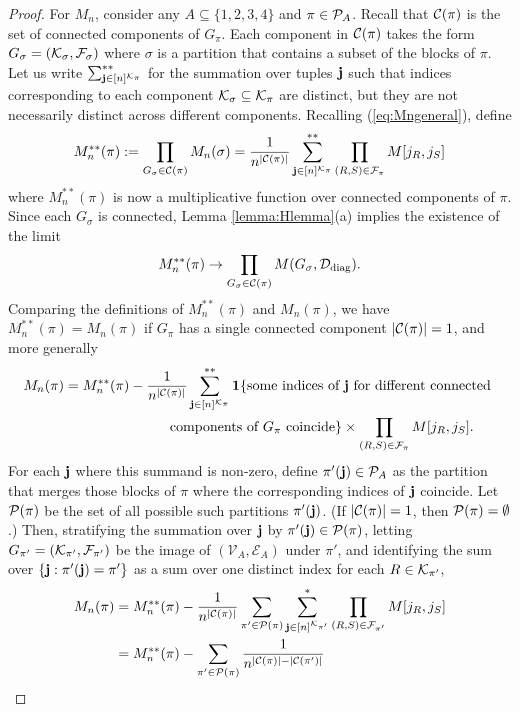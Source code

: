 \documentclass[10pt,reqno]{amsart}
\def\cV{\mathcal{V}}
\def\cE{\mathcal{E}}
\def\1{\mathbf{1}}
\newcommand{\tdiag}{\mathrm{diag}}
\begin{document}
\begin{proof}
For $M_n$, consider any $A \subseteq \{1,2,3,4\}$ and
$\pi \in \mathcal{P}_A$. Recall that $\mathcal{C}(\pi)$ is the set of
connected components of $G_\pi$. Each component in
$\mathcal{C}(\pi)$ takes the form $G_\sigma=(\mathcal{K}_\sigma,\mathcal{F}_\sigma)$ where $\sigma$ is a
partition that contains a subset of the blocks of $\pi$. Let us write
$\sum_{\mathbf{j} \in [n]^{\mathcal{K}_\pi}}^{**}$
for the summation over tuples $\mathbf{j}$ such that indices corresponding to
each component $\mathcal{K}_\sigma \subseteq \mathcal{K}_\pi$ are distinct,
but they are not necessarily distinct
across different components. Recalling (\ref{eq:Mngeneral}), define
\[M_n^{**}(\pi):=\prod_{G_\sigma \in \mathcal{C}(\pi)} M_n(\sigma)
=\frac{1}{n^{|\mathcal{C}(\pi)|}} \sum_{\mathbf{j} \in [n]^{\mathcal{K}_\pi}}^{**} \prod_{(R,S) \in
\mathcal{F}_\pi} M[j_R,j_S]\]
where $M_n^{**}(\pi)$ is now a multiplicative function over connected components
of $\pi$. Since each $G_\sigma$ is connected, Lemma \ref{lemma:Hlemma}(a) implies
the existence of the limit
\begin{equation}\label{eq:tildeMnlimit}
M_n^{**}(\pi) \to \prod_{G_\sigma \in \cC(\pi)} M(G_\sigma,\cD_{\tdiag}).
\end{equation}
Comparing the definitions of $M_n^{**}(\pi)$ and $M_n(\pi)$, we have
$M_n^{**}(\pi)=M_n(\pi)$ if $G_\pi$ has a single connected component
$|\mathcal{C}(\pi)|=1$, and more generally
\begin{align*}
M_n(\pi)&=M_n^{**}(\pi)-\frac{1}{n^{|\cC(\pi)|}}
\sum_{\bj \in [n]^{\cK_\pi}}^{**}
\1\{\text{some indices of } \bj \text{ for different connected }\\
&\hspace{1in} \text{ components of } G_\pi \text{ coincide}\}
\times \prod_{(R,S) \in \cF_\pi} M[j_R,j_S].
\end{align*}
For each $\mathbf{j}$ where this summand is non-zero, define
$\pi'(\mathbf{j}) \in \mathcal{P}_A$ as the partition that merges those blocks of $\pi$
where the corresponding indices of $\mathbf{j}$ coincide.
Let $\mathcal{P}(\pi)$ be the set of all possible such partitions $\pi'(\mathbf{j})$.
(If $|\mathcal{C}(\pi)|=1$, then $\mathcal{P}(\pi)=\emptyset$.)
Then, stratifying the summation over $\mathbf{j}$ by $\pi'(\mathbf{j}) \in \mathcal{P}(\pi)$,
letting $G_{\pi'}=(\mathcal{K}_{\pi'},\mathcal{F}_{\pi'})$ be the image of $(\cV_A,\cE_A)$
under $\pi'$, and identifying the sum over $\{\mathbf{j}:\pi'(\mathbf{j})=\pi'\}$ as a sum over
one distinct index for each $R \in \mathcal{K}_{\pi'}$,
\begin{align}
M_n(\pi)&=M_n^{**}(\pi)-\frac{1}{n^{|\cC(\pi)|}} \sum_{\pi' \in \cP(\pi)}
\sum_{\bj \in [n]^{\cK_{\pi'}}}^* \prod_{(R,S) \in \cF_{\pi'}} M[j_R,j_S]\notag\\
&=M_n^{**}(\pi)-\sum_{\pi' \in \cP(\pi)} \frac{1}{n^{|\cC(\pi)|-|\cC(\pi')|}}

\end{align}
\end{proof}
\end{document}
